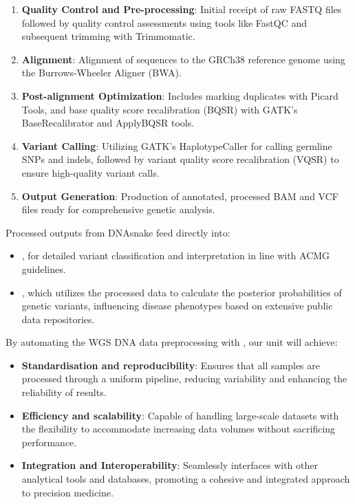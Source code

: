 \begin{enumerate}
    \item \textbf{Quality Control and Pre-processing}: Initial receipt of raw FASTQ files followed by quality control assessments using tools like FastQC and subsequent trimming with Trimmomatic.
    \item \textbf{Alignment}: Alignment of sequences to the GRCh38 reference genome using the Burrows-Wheeler Aligner (BWA).
    \item \textbf{Post-alignment Optimization}: Includes marking duplicates with Picard Tools, and base quality score recalibration (BQSR) with GATK’s BaseRecalibrator and ApplyBQSR tools.
    \item \textbf{Variant Calling}: Utilizing GATK’s HaplotypeCaller for calling germline SNPs and indels, followed by variant quality score recalibration (VQSR) to ensure high-quality variant calls.
    \item \textbf{Output Generation}: Production of annotated, processed BAM and VCF files ready for comprehensive genetic analysis.
\end{enumerate}


Processed outputs from DNAsnake feed directly into:
\begin{itemize}
    \item \acmguru{}, for detailed variant classification and interpretation in line with ACMG guidelines.
    \item \deepinfer{}, which utilizes the processed data to calculate the posterior probabilities of genetic variants, influencing disease phenotypes based on extensive public data repositories.
\end{itemize}


By automating the WGS DNA data preprocessing with \dnasnake, our unit will achieve:
\begin{itemize}
    \item \textbf{Standardisation and reproducibility}: Ensures that all samples are processed through a uniform pipeline, reducing variability and enhancing the reliability of results.
    \item \textbf{Efficiency and scalability}: Capable of handling large-scale datasets with the flexibility to accommodate increasing data volumes without sacrificing performance.
    \item \textbf{Integration and Interoperability}: Seamlessly interfaces with other analytical tools and databases, promoting a cohesive and integrated approach to precision medicine.
\end{itemize}


